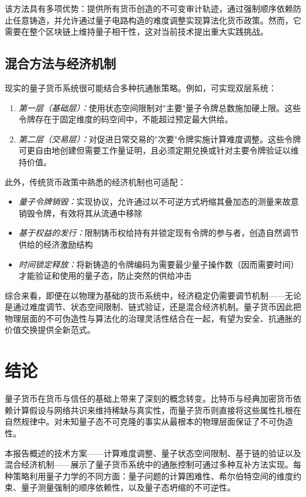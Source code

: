 \documentclass[a4paper,10.5pt,twoside]{article}
\begin{document}
该方法具有多项优势：提供所有货币创造的不可变审计轨迹，通过强制顺序依赖防止任意铸造，并允许通过量子电路构造的难度调整实现算法化货币政策。然而，它需要在整个区块链上维持量子相干性，这对当前技术提出重大实践挑战。

\subsection{混合方法与经济机制}\label{s:3.4}
现实的量子货币系统很可能结合多种抗通胀策略。例如，可实现双层系统：

\begin{enumerate}
\item \textit{第一层（基础层）：}使用状态空间限制对"主要"量子令牌总数施加硬上限。这些令牌存在于固定维度的码空间中，不能超过预定最大供给。

\item \textit{第二层（交易层）：}对促进日常交易的"次要"令牌实施计算难度调整。这些令牌可更自由地创建但需要工作量证明，且必须定期兑换或针对主要令牌验证以维持价值。
\end{enumerate}

此外，传统货币政策中熟悉的经济机制也可适配：
\begin{itemize}
\item \textit{量子令牌销毁：}实现协议，允许通过以不可逆方式坍缩其叠加态的测量来故意销毁令牌，有效将其从流通中移除
\item \textit{基于权益的发行：}限制铸币权给持有并锁定现有令牌的参与者，创造自然调节供给的经济激励结构
\item \textit{时间锁定释放：}将新铸造的令牌编码为需要最少量子操作数（因而需要时间）才能验证和使用的量子态，防止突然的供给冲击
\end{itemize}

综合来看，即便在以物理为基础的货币系统中，经济稳定仍需要调节机制——无论是通过难度调节、状态空间限制、链式验证，还是混合经济机制。量子货币因此把物理层面的不可伪造性与算法化的治理灵活性结合在一起，有望为安全、抗通胀的价值交换提供全新范式。

\section{结论}\label{s:4}
量子货币在货币与信任的基础上带来了深刻的概念转变。比特币与经典加密货币依赖计算假设与网络共识来维持稀缺与真实性，而量子货币则直接将这些属性扎根在自然规律中。对未知量子态不可克隆的事实从最根本的物理层面保证了不可伪造性。

本报告概述的技术方案——计算难度调整、量子状态空间限制、基于链的验证以及混合经济机制——展示了量子货币系统中的通胀控制可通过多种互补方法实现。每种策略利用量子力学的不同方面：量子问题的计算困难性、希尔伯特空间的维度约束、量子测量强制的顺序依赖性，以及量子态坍缩的不可逆性。
\end{document}
